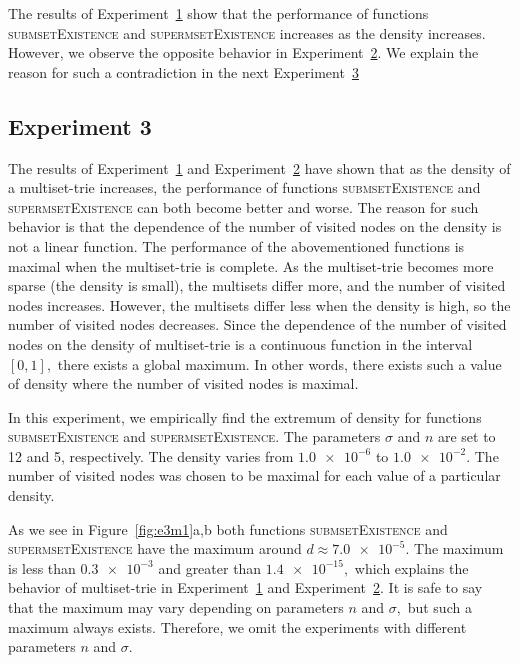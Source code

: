 \documentclass[algorithms,article,accept,pdftex,moreauthors]{Definitions/mdpi}
\begin{document}
The results of Experiment~\hyperref[s:exp1]{1} show that the performance 
of functions \textsc{submsetExistence} and \textsc{supermsetExistence} increases 
as the density increases. However, we observe the opposite behavior in 
Experiment~\hyperref[s:exp2]{2}. We explain the reason for such a contradiction 
in the next Experiment~\hyperref[s:exp3]{3} 


\subsection{Experiment 3} \label{s:exp3}
The results of Experiment~\hyperref[s:exp1]{1} and Experiment~\hyperref[s:exp2]{2} 
have shown that as the density of a multiset-trie increases, the performance of 
functions \textsc{submsetExistence} and \textsc{supermsetExistence} can both become 
better and worse. The reason for such behavior is that the dependence of the 
number of visited nodes on the density is not a linear function. 
The performance of the abovementioned functions is maximal when the multiset-trie is 
complete. As the multiset-trie becomes more sparse (the density is small), the multisets
differ more, and the number of visited nodes increases. However, the multisets differ
less when the density is high, so the number of visited nodes decreases. Since 
the dependence of the number of visited nodes on the density of multiset-trie 
is a continuous function in the interval $[0,1],$ there exists a global maximum. 
In other words, there exists such a value of density where the number of visited 
nodes is maximal. 

In this experiment, we empirically find the extremum of density for functions 
\textsc{submsetExistence} and \textsc{supermsetExistence}. The parameters 
$\sigma$ and $n$ are set to 12 and 5, respectively. The density varies from 
$\num{1.0e-6}$ to $\num{1.0e-2}.$ The number of visited nodes was chosen to be 
maximal for each value of a particular density.

As we see in Figure~\ref{fig:e3m1}a,b both functions 
\textsc{submsetExistence} and \textsc{supermsetExistence} have the maximum 
around $d\approx \num{7.0e-5}.$ The maximum is less than $\num{0.3e-3}$ and 
greater than $\num{1.4e-15},$ which explains the behavior of multiset-trie in 
Experiment~\hyperref[s:exp1]{1} and Experiment~\hyperref[s:exp2]{2}. It is safe 
to say that the maximum may vary depending on parameters $n$ and $\sigma,$ but 
such a maximum always exists. Therefore, we omit the experiments with different 
parameters $n$ and $\sigma.$
\end{document}
